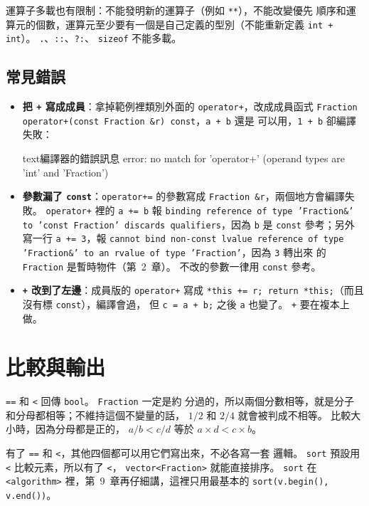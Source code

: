 運算子多載也有限制：不能發明新的運算子（例如 \texttt{**}），不能改變優先
順序和運算元的個數，運算元至少要有一個是自己定義的型別（不能重新定義
\texttt{int + int}）。 \texttt{.}、\texttt{::}、\texttt{?:}、
\texttt{sizeof} 不能多載。

\subsection{常見錯誤}

\begin{itemize}
\item \textbf{把 \texttt{+} 寫成成員}：拿掉範例裡類別外面的
\texttt{operator+}，改成成員函式
\texttt{Fraction operator+(const Fraction \&r) const}，\texttt{a + b} 還是
可以用，\texttt{1 + b} 卻編譯失敗：
\begin{code}{text}{編譯器的錯誤訊息}
error: no match for 'operator+' (operand types are 'int' and 'Fraction')
\end{code}
\item \textbf{參數漏了 \texttt{const}}：\texttt{operator+=} 的參數寫成
\texttt{Fraction \&r}，兩個地方會編譯失敗。 \texttt{operator+} 裡的
\texttt{a += b} 報 \texttt{binding reference of type 'Fraction\&' to
'const Fraction' discards qualifiers}，因為 \texttt{b} 是 \texttt{const}
參考；另外寫一行 \texttt{a += 3}，報 \texttt{cannot bind non-const lvalue reference of
type 'Fraction\&' to an rvalue of type 'Fraction'}，因為 \texttt{3} 轉出來
的 \texttt{Fraction} 是暫時物件（第~2~章）。 不改的參數一律用
\texttt{const} 參考。
\item \textbf{\texttt{+} 改到了左邊}：成員版的 \texttt{operator+} 寫成
\texttt{*this += r; return *this;}（而且沒有標 \texttt{const}），編譯會過，
但 \texttt{c = a + b;} 之後 \texttt{a} 也變了。 \texttt{+} 要在複本上做。
\end{itemize}

\section{比較與輸出}
\label{sec:compare-output}

\texttt{==} 和 \texttt{<} 回傳 \texttt{bool}。 \texttt{Fraction} 一定是約
分過的，所以兩個分數相等，就是分子和分母都相等；不維持這個不變量的話，
$1/2$ 和 $2/4$ 就會被判成不相等。 比較大小時，因為分母都是正的，
$a/b < c/d$ 等於 $a \times d < c \times b$。

有了 \texttt{==} 和 \texttt{<}，其他四個都可以用它們寫出來，不必各寫一套
邏輯。 \texttt{sort} 預設用 \texttt{<} 比較元素，所以有了 \texttt{<}，
\texttt{vector<Fraction>} 就能直接排序。 \texttt{sort} 在
\texttt{<algorithm>} 裡，第~9~章再仔細講，這裡只用最基本的
\texttt{sort(v.begin(), v.end())}。

